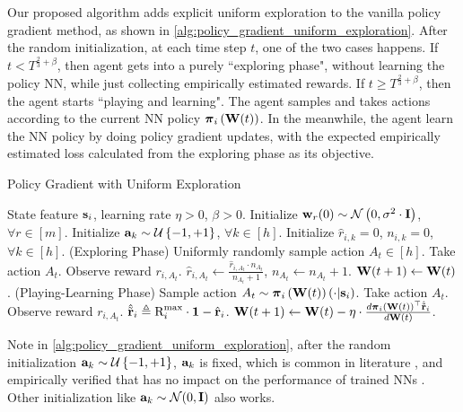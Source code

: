 Our proposed algorithm adds explicit uniform exploration to the vanilla policy gradient method, as shown in \cref{alg:policy_gradient_uniform_exploration}. After the random initialization, at each time step $t$, one of the two cases happens. If $t < T^{\frac{2}{3} + \beta}$, then agent gets into a purely ``exploring phase", without learning the policy NN, while just collecting empirically estimated rewards. If $t \ge T^{\frac{2}{3} + \beta}$, then the agent starts ``playing and learning". The agent samples and takes actions according to the current NN policy ${\boldsymbol{\pi}}_{i}\left({\mathbf{W}}(t)\right)$. In the meanwhile, the agent learn the NN policy by doing policy gradient updates, with the expected empirically estimated loss calculated from the exploring phase as its objective.

\begin{algorithm}[t]
   \caption{Policy Gradient with Uniform Exploration}
\label{alg:policy_gradient_uniform_exploration}
\begin{algorithmic}
    State feature ${\mathbf{s}}_i$, learning rate $\eta > 0$, $\beta > 0$.
   \STATE Initialize ${\mathbf{w}}_r(0) \sim {\mathcal{N}}\left( 0, \sigma^2 \cdot {\mathbf{I}} \right)$, $\forall r \in [m]$. \STATE Initialize ${\mathbf{a}}_k \sim {\mathcal{U}}\left\{-1, +1\right\}$, $\forall k \in [h]$.
   \STATE Initialize $\hat{r}_{i,k} = 0$, $n_{i,k} = 0$, $\forall k \in [h]$.
   \STATE (Exploring Phase)
   \STATE Uniformly randomly sample action $A_{t} \in [h]$.
   \STATE Take action $A_{t}$.  Observe reward $r_{i, A_{t}}$.
   \STATE $\hat{r}_{i,A_{t}} \leftarrow \frac{\hat{r}_{i,A_{t}} \cdot 
   n_{A_{t}}}{ n_{A_{t}} + 1}$, $n_{A_{t}} \leftarrow n_{A_{t}} + 1$.
   \STATE ${\mathbf{W}}(t+1) \leftarrow {\mathbf{W}}(t)$.
   \ELSE
   \STATE (Playing-Learning Phase)
   \STATE Sample action $A_{t} \sim {\boldsymbol{\pi}}_{i}\left({\mathbf{W}}(t)\right)\left(\cdot \middle| {\mathbf{s}}_i \right)$.
   \STATE Take action $A_{t}$. Observe reward $r_{i, A_{t}}$.
   \STATE $\hat{{\tilde{\mathbf{r}}}}_i \triangleq {\text{R}}_i^{\max} \cdot {\mathbf{1}} - {\hat{\mathbf{r}}}_i$.
   \STATE ${\mathbf{W}}(t+1) \leftarrow {\mathbf{W}}(t) - \eta \cdot \frac{d {\boldsymbol{\pi}}_{i}\left({\mathbf{W}}(t)\right)^\top \hat{{\tilde{\mathbf{r}}}}_i}{d {\mathbf{W}}(t)}$.
   \ENDIF
   \ENDFOR
\end{algorithmic}
\end{algorithm}

Note in \cref{alg:policy_gradient_uniform_exploration}, after the random initialization ${\mathbf{a}}_k \sim {\mathcal{U}}\left\{-1, +1\right\}$, ${\mathbf{a}}_k$ is fixed, which is common in literature \citep{li2018learning,du2018gradientA,du2018gradientB,allen2018convergenceA,allen2018convergenceB}, and empirically verified that has no impact on the performance of trained NNs \citep{hoffer2018fix}. Other initialization like ${\mathbf{a}}_k \sim {\mathcal{N}}(0, {\mathbf{I}})$ also works.

